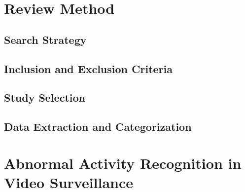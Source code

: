 \documentclass[11pt,a4paper]{article}
\begin{document}
    \section{Review Method}
    \label{sec:review-method}

    \subsection{Search Strategy}
    \label{subsec:search-strategy}

    \subsection{Inclusion and Exclusion Criteria}
    \label{subsec:selection-criteria}

    \subsection{Study Selection}
    \label{subsec:study-selection}

    \subsection{Data Extraction and Categorization}
    \label{subsec:data-extraction}

    \section{Abnormal Activity Recognition in Video Surveillance}
    \label{sec:domain-foundations}
\end{document}
